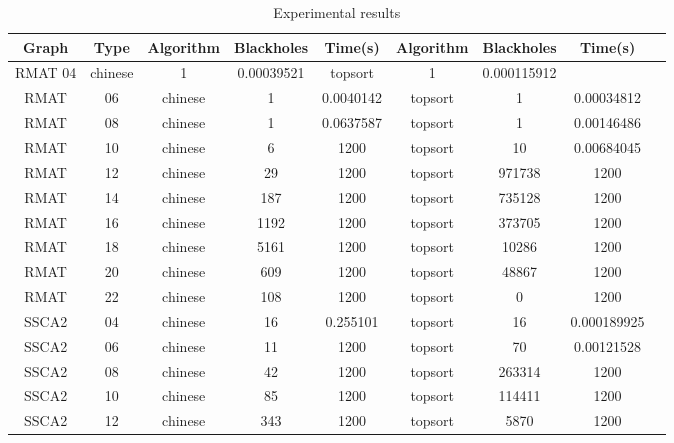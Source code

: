 \documentclass{svproc}
\begin{document}
\begin{table}[]
\caption{Experimental results}
\label{tabular:tableresults}
\begin{center}
\begin{tabular}{c|c|c|c|c|c|c|c|c}
Graph & Type & Algorithm & Blackholes & Time(s) & Algorithm & Blackholes & Time(s) \\
\hline
RMAT 04 & chinese & 1 & 0.00039521 & topsort & 1 & 0.000115912 \\
RMAT & 06 & chinese & 1 & 0.0040142 & topsort & 1 & 0.00034812 \\
RMAT & 08 & chinese & 1 & 0.0637587 & topsort & 1 & 0.00146486 \\
RMAT & 10 & chinese & 6 & 1200 & topsort & 10 & 0.00684045 \\
RMAT & 12 & chinese & 29 & 1200 & topsort & 971738 & 1200 \\
RMAT & 14 & chinese & 187 & 1200 & topsort & 735128 & 1200 \\
RMAT & 16 & chinese & 1192 & 1200 & topsort & 373705 & 1200 \\
RMAT & 18 & chinese & 5161 & 1200 & topsort & 10286 & 1200 \\
RMAT & 20 & chinese & 609 & 1200 & topsort & 48867 & 1200 \\
RMAT & 22 & chinese & 108 & 1200 & topsort & 0 & 1200 \\
SSCA2 & 04 & chinese & 16 & 0.255101 & topsort & 16 & 0.000189925 \\
SSCA2 & 06 & chinese & 11 & 1200 & topsort & 70 & 0.00121528 \\
SSCA2 & 08 & chinese & 42 & 1200 & topsort & 263314 & 1200 \\
SSCA2 & 10 & chinese & 85 & 1200 & topsort & 114411 & 1200 \\
SSCA2 & 12 & chinese & 343 & 1200 & topsort & 5870 & 1200 \\
\end{tabular}
\end{center}
\end{table}
\end{document}
